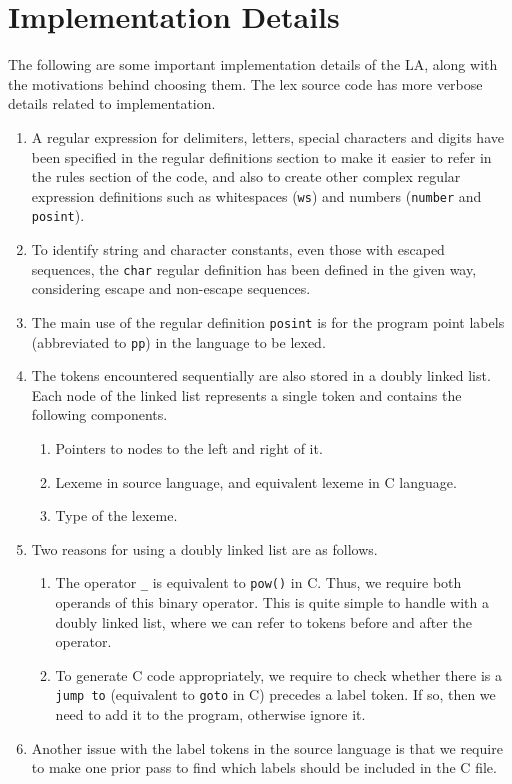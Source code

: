 \documentclass[journal,12pt,twocolumn]{IEEEtran}
\begin{document}
\section{Implementation Details}
The following are some important implementation details of the LA, along with
the motivations behind choosing them. The lex source code has more verbose
details related to implementation.
\begin{enumerate}
    \item A regular expression for delimiters, letters, special characters and
    digits have been specified in the regular definitions section to make it
    easier to refer in the rules section of the code, and also to create other
    complex regular expression definitions such as whitespaces (\texttt{ws}) and
    numbers (\texttt{number} and \texttt{posint}).
    \item To identify string and character constants, even those with escaped
    sequences, the \texttt{char} regular definition has been defined in the
    given way, considering escape and non-escape sequences.
    \item The main use of the regular definition \texttt{posint} is for the
    program point labels (abbreviated to \texttt{pp}) in the language to be
    lexed.
    \item The tokens encountered sequentially are also stored in a doubly linked
    list. Each node of the linked list represents a single token and contains
    the following components.
    \begin{enumerate}
        \item Pointers to nodes to the left and right of it.
        \item Lexeme in source language, and equivalent lexeme in C language.
        \item Type of the lexeme.
    \end{enumerate}
    \item Two reasons for using a doubly linked list are as follows.
    \begin{enumerate}
        \item The operator \texttt{\_} is equivalent to \texttt{pow()} in C.
        Thus, we require both operands of this binary operator. This is quite
        simple to handle with a doubly linked list, where we can refer to tokens
        before and after the operator.
        \item To generate C code appropriately, we require to check whether
        there is a \texttt{jump to} (equivalent to \texttt{goto} in C) precedes
        a label token. If so, then we need to add it to the program, otherwise
        ignore it.
    \end{enumerate}
    \item Another issue with the label tokens in the source language is that we
    require to make one prior pass to find which labels should be included in
    the C file. 
    

\end{enumerate}
\end{document}
